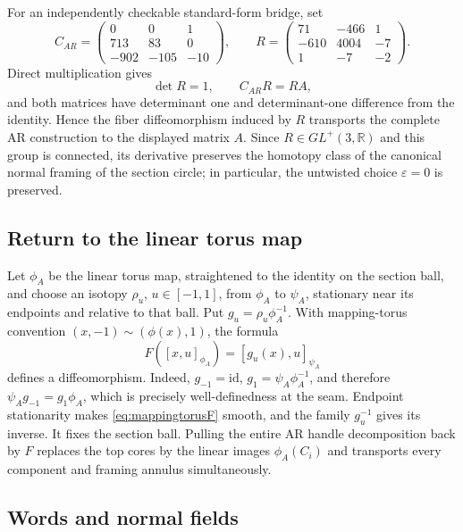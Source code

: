 \documentclass[11pt]{amsart}
\theoremstyle{definition}
\theoremstyle{remark}
\begin{document}
For an independently checkable standard-form bridge, set
\[
C_{AR}=\begin{pmatrix}0&0&1\\713&83&0\\-902&-105&-10\end{pmatrix},
\qquad
R=\begin{pmatrix}71&-466&1\\-610&4004&-7\\1&-7&-2\end{pmatrix}.
\]
Direct multiplication gives
\[
\det R=1,\qquad C_{AR}R=RA,
\]
and both matrices have determinant one and determinant-one difference from
the identity.  Hence the fiber diffeomorphism induced by $R$ transports the
complete AR construction to the displayed matrix $A$.  Since
$R\in GL^+(3,\mathbb R)$ and this group is connected, its derivative preserves
the homotopy class of the canonical normal framing of the section circle; in
particular, the untwisted choice $\varepsilon=0$ is preserved.

\subsection{Return to the linear torus map}

Let $\phi_A$ be the linear torus map, straightened to the identity on the
section ball, and choose an isotopy $\rho_u$, $u\in[-1,1]$, from $\phi_A$ to
$\psi_A$, stationary near its endpoints and relative to that ball.  Put
$g_u=\rho_u\phi_A^{-1}$.  With mapping-torus convention
$(x,-1)\sim(\phi(x),1)$, the formula
\begin{equation}\label{eq:mappingtorusF}
F([x,u]_{\phi_A})=[g_u(x),u]_{\psi_A}
\end{equation}
defines a diffeomorphism.  Indeed, $g_{-1}=\mathrm{id}$,
$g_1=\psi_A\phi_A^{-1}$, and therefore
$\psi_Ag_{-1}=g_1\phi_A$, which is precisely well-definedness at the seam.
Endpoint stationarity makes \eqref{eq:mappingtorusF} smooth, and the family
$g_u^{-1}$ gives its inverse.  It fixes the section ball.  Pulling the entire
AR handle decomposition back by $F$ replaces the top cores by the linear
images $\phi_A(C_i)$ and transports every component and framing annulus
simultaneously.

\subsection{Words and normal fields}
\end{document}
